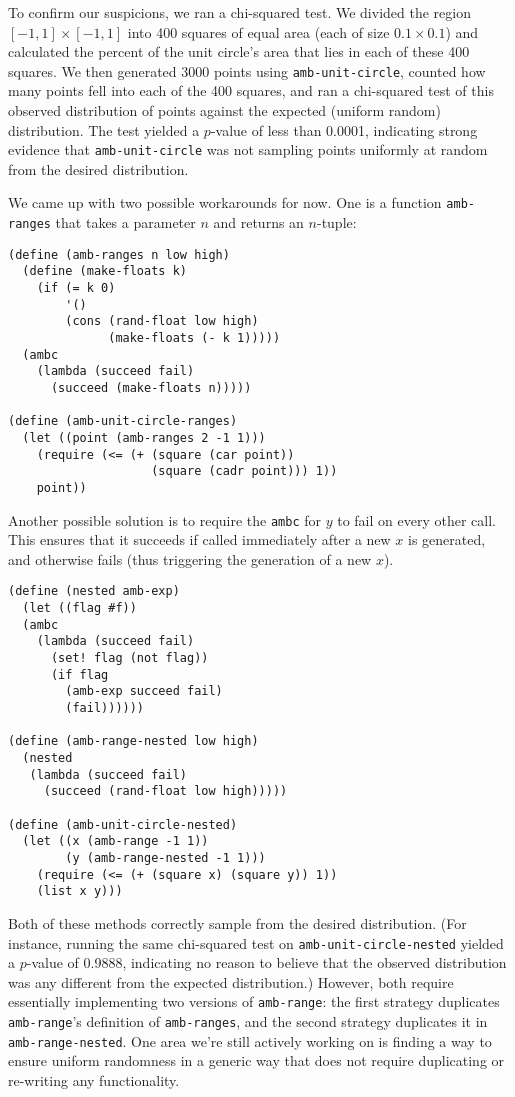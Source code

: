 \documentclass{article}
\begin{document}
To confirm our suspicions, we ran a chi-squared test. We divided the region
$[-1,1]\times[-1,1]$ into 400 squares of equal area (each of size $0.1\times
0.1$) and calculated the percent of the unit circle's area that lies in each of
these 400 squares. We then generated 3000 points using
\texttt{amb-unit-circle}, counted how many points fell into each of the 400
squares, and ran a chi-squared test of this observed distribution of points
against the expected (uniform random) distribution. The test yielded a
$p$-value of less than 0.0001, indicating strong evidence that
\texttt{amb-unit-circle} was not sampling points uniformly at random from the
desired distribution.

We came up with two possible workarounds for now. One is a function
\texttt{amb-ranges} that takes a parameter $n$ and returns an $n$-tuple:
\begin{lstlisting}
(define (amb-ranges n low high)
  (define (make-floats k)
    (if (= k 0)
        '()
        (cons (rand-float low high)
              (make-floats (- k 1)))))
  (ambc
    (lambda (succeed fail)
      (succeed (make-floats n)))))

(define (amb-unit-circle-ranges)
  (let ((point (amb-ranges 2 -1 1)))
    (require (<= (+ (square (car point))
                    (square (cadr point))) 1))
    point))
\end{lstlisting}

Another possible solution is to require the \texttt{ambc} for $y$ to fail on
every other call. This ensures that it succeeds if called immediately after a
new $x$ is generated, and otherwise fails (thus triggering the generation of a
new $x$).
\begin{lstlisting}
(define (nested amb-exp)
  (let ((flag #f))
  (ambc
    (lambda (succeed fail)
      (set! flag (not flag))
      (if flag
        (amb-exp succeed fail)
        (fail))))))

(define (amb-range-nested low high)
  (nested
   (lambda (succeed fail)
     (succeed (rand-float low high)))))

(define (amb-unit-circle-nested)
  (let ((x (amb-range -1 1))
        (y (amb-range-nested -1 1)))
    (require (<= (+ (square x) (square y)) 1))
    (list x y)))
\end{lstlisting}

Both of these methods correctly sample from the desired distribution. (For
instance, running the same chi-squared test on \texttt{amb-unit-circle-nested}
yielded a $p$-value of 0.9888, indicating no reason to believe that the
observed distribution was any different from the expected distribution.)
However, both require essentially implementing two versions of
\texttt{amb-range}: the first strategy duplicates \texttt{amb-range}'s
definition of \texttt{amb-ranges}, and the second strategy duplicates it in
\texttt{amb-range-nested}. One area we're still actively working on is finding
a way to ensure uniform randomness in a generic way that does not require
duplicating or re-writing any functionality.
\end{document}
